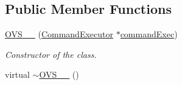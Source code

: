 \subsection*{\-Public \-Member \-Functions}
\begin{DoxyCompactItemize}
\item 
\hyperlink{classOVS__1__10_a1b3da4d3386fc896dc31030d4a473d12}{\-O\-V\-S\-\_\-\_} (\hyperlink{classCommandExecutor}{\-Command\-Executor} $\ast$\hyperlink{classAbstractSwitch_af301a644b47e434e8acf1b78e3033378}{command\-Exec})
\begin{DoxyCompactList}\small\item\em \-Constructor of the class. \end{DoxyCompactList}\item 
\hypertarget{classOVS__1__10_acc04437100028ff72ebdcc2df9dc002e}{virtual \hyperlink{classOVS__1__10_acc04437100028ff72ebdcc2df9dc002e}{$\sim$\-O\-V\-S\-\_\-\_} ()}\label{classOVS__1__10_acc04437100028ff72ebdcc2df9dc002e}


\end{DoxyCompactItemize}
